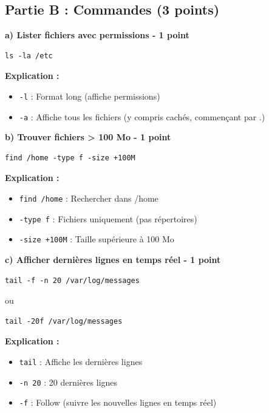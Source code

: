 \documentclass[12pt,a4paper]{article}
\begin{document}
\subsection*{Partie B : Commandes (3 points)}

\begin{answerbox}
\textbf{a) Lister fichiers avec permissions - 1 point}

\begin{lstlisting}
ls -la /etc
\end{lstlisting}

\textbf{Explication :}
\begin{itemize}
    \item \texttt{-l} : Format long (affiche permissions)
    \item \texttt{-a} : Affiche tous les fichiers (y compris cachés, commençant par .)
\end{itemize}

\textbf{b) Trouver fichiers > 100 Mo - 1 point}

\begin{lstlisting}
find /home -type f -size +100M
\end{lstlisting}

\textbf{Explication :}
\begin{itemize}
    \item \texttt{find /home} : Rechercher dans /home
    \item \texttt{-type f} : Fichiers uniquement (pas répertoires)
    \item \texttt{-size +100M} : Taille supérieure à 100 Mo
\end{itemize}

\textbf{c) Afficher dernières lignes en temps réel - 1 point}

\begin{lstlisting}
tail -f -n 20 /var/log/messages
\end{lstlisting}

ou

\begin{lstlisting}
tail -20f /var/log/messages
\end{lstlisting}

\textbf{Explication :}
\begin{itemize}
    \item \texttt{tail} : Affiche les dernières lignes
    \item \texttt{-n 20} : 20 dernières lignes
    \item \texttt{-f} : Follow (suivre les nouvelles lignes en temps réel)
\end{itemize}
\end{answerbox}
\end{document}
